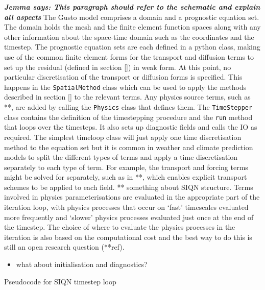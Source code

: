 \documentclass[journal abbreviation, manuscript]{copernicus}
\newcommand{\JScomment}[1]{\textit{\textbf{Jemma says: #1}}}
\begin{document}
\JScomment{This paragraph should refer to the schematic and explain
  all aspects} The Gusto model comprises a domain and a prognostic
equation set. The domain holds the mesh and the finite element
function spaces along with any other information about the space-time
domain such as the coordinates and the timestep. The prognostic
equation sets are each defined in a python class, making use of the
common finite element forms for the transport and diffusion terms to
set up the residual (defined in section \ref{}) in weak form. At this
point, no particular discretisation of the transport or diffusion
forms is specified. This happens in the \texttt{SpatialMethod} class
which can be used to apply the methods described in section \ref{} to
the relevant terms. Any physics source terms, such as **, are added by
calling the \texttt{Physics} class that defines them. The
\texttt{TimeStepper} class contains the definition of the timestepping
procedure and the \texttt{run} method that loops over the
timesteps. It also sets up diagnostic fields and calls the IO as
required. The simplest timeloop class will just apply one time
discretisation method to the equation set but it is common in weather
and climate prediction models to split the different types of terms
and apply a time discretisation separately to each type of term. For
example, the transport and forcing terms might be solved for
separately, such as in **, which enables explicit transport schemes to
be applied to each field. ** something about SIQN structure. Terms
involved in physics parameterisations are evaluated in the appropriate
part of the iteration loop, with physics processes that occur on
`fast' timescales evaluated more frequently and `slower' physics
processes evaluated just once at the end of the timestep. The choice
of where to evaluate the physics processes in the iteration is also
based on the computational cost and the best way to do this is still
an open research question (**ref).

\begin{itemize}
\item what about initialisation and diagnostics?
\end{itemize}

\begin{algorithm}
  \caption{Pseudocode for SIQN timestep loop}\label{alg:SIQN}
  \begin{algorithmic}
    \STATE
  \end{algorithmic}
\end{algorithm}
\end{document}
